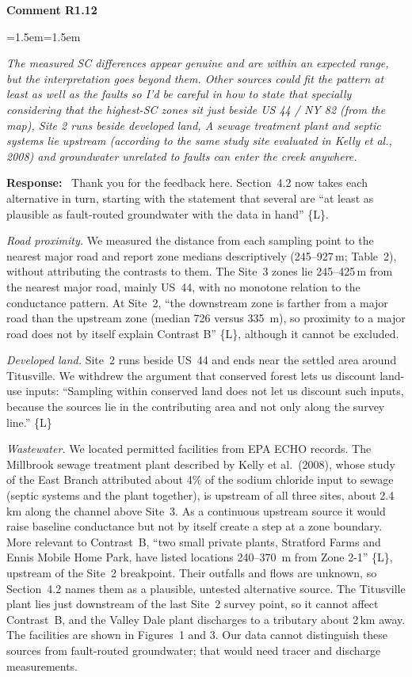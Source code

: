 \documentclass[11pt]{article}
\newenvironment{comment}[1]
  {\par\medskip\noindent\textbf{Comment #1}\par
   \begin{list}{}{\leftmargin=1.5em\rightmargin=1.5em}\item\color{commentcolor}\itshape}
  {\end{list}}
\newenvironment{response}
  {\par\noindent\textbf{Response:}\ }
  {\par}
\newcommand{\Ln}[1]{\{L\Lref{L:#1}\}}
\newcommand{\mq}[1]{``#1''}
\begin{document}
\begin{comment}{R1.12}
The measured SC differences appear genuine and are within an expected range, but the
interpretation goes beyond them. Other sources could fit the pattern at least as well as
the faults so I'd be careful in how to state that specially considering that the
highest-SC zones sit just beside US 44 / NY 82 (from the map), Site 2 runs beside
developed land, A sewage treatment plant and septic systems lie upstream (according to the
same study site evaluated in Kelly et al., 2008) and groundwater unrelated to faults can
enter the creek anywhere.
\end{comment}
\begin{response}
Thank you for the feedback here. Section~4.2 now takes each alternative in turn, starting with the statement that several
are \mq{at least as plausible as fault-routed groundwater with the data in hand} \Ln{alt-start}.

\emph{Road proximity.} We measured the distance from each sampling point to the nearest major
road and report zone medians descriptively (245--927\,m; Table~2), without
attributing the contrasts to them. The Site~3 zones lie 245--425\,m from the nearest major road,
mainly US~44, with no monotone relation to the conductance pattern. At Site~2, \mq{the
downstream zone is farther from a major road than the upstream zone (median 726 versus 335~m),
so proximity to a major road does not by itself explain Contrast B} \Ln{alt-road-site2},
although it cannot be excluded.

\emph{Developed land.} Site~2 runs beside US~44 and ends near the settled area around
Titusville. We withdrew the argument that conserved forest lets us discount land-use inputs:
\mq{Sampling within conserved land does not let us discount such inputs, because the sources
lie in the contributing area and not only along the survey line.} \Ln{alt-withdraw}

\emph{Wastewater.} We located permitted facilities from EPA ECHO records. The Millbrook sewage
treatment plant described by Kelly et al.\ (2008), whose study of the East Branch attributed
about 4\% of the sodium chloride input to sewage (septic systems and the plant together), is
upstream of all three sites, about 2.4\,km along the channel above Site~3. As a continuous
upstream source it would raise baseline conductance but not by itself create a step at a zone
boundary. More relevant to Contrast~B, \mq{two small private plants, Stratford Farms and Ennis
Mobile Home Park, have listed locations 240--370~m from Zone 2-1} \Ln{alt-wwtp}, upstream
of the Site~2 breakpoint. Their outfalls and flows are unknown, so Section~4.2 names them as a plausible, untested
alternative source. The Titusville plant lies just
downstream of the last Site~2 survey point, so it cannot affect Contrast~B, and the Valley Dale
plant discharges to a tributary about 2\,km away. The facilities are shown in Figures~1 and 3.
Our data cannot distinguish these sources from fault-routed groundwater; that would need tracer
and discharge measurements.
\end{response}
\end{document}
